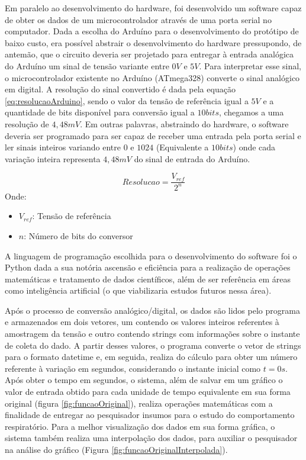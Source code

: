 Em paralelo ao desenvolvimento do hardware, foi desenvolvido um software capaz de obter os dados de um microcontrolador através de uma porta serial no computador. Dada a escolha do Arduíno para o desenvolvimento do protótipo de baixo custo, era possível abstrair o desenvolvimento do hardware pressupondo, de antemão, que o circuito deveria ser projetado para entregar à entrada analógica do Arduíno um sinal de tensão variante entre $0V$ e $5V$. Para interpretar esse sinal, o microcontrolador existente no Arduíno (ATmega328) converte o sinal analógico em digital. A resolução do sinal convertido é dada pela equação \ref{eq:resolucaoArduino}, sendo o valor da tensão de referência igual a $5V$ e a quantidade de bits disponível para conversão igual a $10bits$, chegamos a uma resolução de $4,48mV$. Em outras palavras, abstraindo do hardware, o software deveria ser programado para ser capaz de receber uma entrada pela porta serial e ler sinais inteiros variando entre  $0$ e $1024$ (Equivalente a $10bits$) onde cada variação inteira representa $4,48mV$ do sinal de entrada do Arduíno.


\begin{equation} \label{eq:resolucaoArduino}
	Resolucao = \dfrac{V_{ref}}{2^n}
\end{equation}
Onde:
\begin{itemize}[label=]
	\item $V_{ref}$: Tensão de referência
	\item $n$: Número de bits do conversor
\end{itemize} 

A linguagem de programação escolhida para o desenvolvimento do software foi o Python dada a sua notória ascensão e eficiência para a realização de operações matemáticas e tratamento de dados científicos, além de ser referência em áreas como inteligência artificial (o que viabilizaria estudos futuros nessa área).

Após o processo de conversão analógico/digital, os dados são lidos pelo programa e armazenados em dois vetores, um contendo os valores inteiros referentes à amostragem da tensão e outro contendo strings com informações sobre o instante de coleta do dado. A partir desses valores, o programa converte o vetor de strings para o formato datetime e, em seguida, realiza do cálculo para obter um número referente à variação em segundos, considerando o instante inicial como $t=0s$. Após obter o tempo em segundos, o sistema, além de salvar em um gráfico o valor de entrada obtido para cada unidade de tempo equivalente em sua forma original (figura \ref{fig:funcaoOriginal}), realiza operações matemáticas com a finalidade de entregar ao pesquisador insumos para o estudo do comportamento respiratório. Para a melhor visualização dos dados em sua forma gráfica, o sistema também realiza uma interpolação dos dados, para auxiliar o pesquisador na análise do gráfico (Figura \ref{fig:funcaoOriginalInterpolada}).


